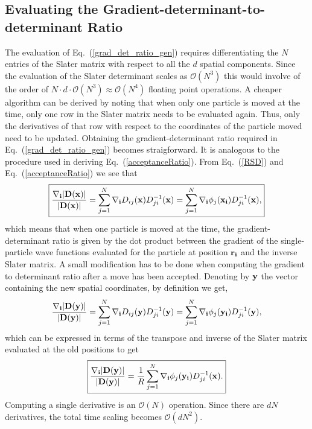 \subsection{Evaluating the Gradient-determinant-to-determinant Ratio}
The evaluation of Eq.~(\ref{grad_det_ratio_gen}) requires differentiating the $N$ entries of the Slater matrix with respect to all the $d$ spatial components. Since the evaluation of the Slater determinant scales as $\mathcal{O}(N^3)$ this would involve of the order of $N \cdot d \cdot \mathcal{O}(N^3) \approx \mathcal{O}(N^4)$ floating point operations. A cheaper algorithm can be derived by noting that when only one particle is moved at the time, 
only one row in the Slater matrix needs to be evaluated again. Thus, only the derivatives of that row with respect to the coordinates of the particle moved need to be updated. Obtaining the gradient-determinant ratio required in Eq.~(\ref{grad_det_ratio_gen}) becomes straigforward. It is analogous to the procedure used in deriving Eq.~(\ref{acceptanceRatio}). From Eq.~(\ref{RSD}) and Eq.~(\ref{acceptanceRatio}) we see that
\begin{equation}\label{gradDetRatioO}
\boxed{\frac{{\bf \nabla_i}|{\bf D}({\bf x})|}{|{\bf D}({\bf x})|} = \sum_{j=1}^{N} {\bf \nabla_i} D_{ij}({\bf x}) D_{ji}^{-1}({\bf x}) = \sum_{j=1}^{N} {\bf \nabla_i}\phi_j({\bf x_i}) D_{ji}^{-1}({\bf x}),}
\end{equation}
which means that when one particle is moved at the time, the gradient-determinant ratio is given by the dot product between the gradient of the single-particle wave functions evaluated for the particle at position ${\bf r_i}$ and the inverse Slater matrix.
A small modification has to be done when computing the gradient to determinant ratio after a move has been accepted. Denoting by ${\bf y}$ the vector containing the new spatial coordinates, by definition we get,
$$
\frac{{\bf \nabla_i}|{\bf D}({\bf y})|}{|{\bf D}({\bf y})|} = \sum_{j=1}^{N} {\bf \nabla_i} D_{ij}({\bf y}) D_{ji}^{-1}({\bf y}) = \sum_{j=1}^{N} {\bf \nabla_i}\phi_j({\bf y_i}) D_{ji}^{-1}({\bf y}),
$$
which can be expressed in terms of the transpose and inverse of the Slater matrix evaluated at the old positions\cite{abinitio} to get
\begin{equation}\label{gradDetRatioN}
\boxed{\frac{{\bf \nabla_i}|{\bf D}({\bf y})|}{|{\bf D}({\bf y})|} = \frac{1}{R} \sum_{j=1}^{N} {\bf \nabla_i}\phi_j({\bf y_i}) D_{ji}^{-1}({\bf x}).}
\end{equation}
Computing a single derivative is an $\mathcal{O}(N)$ operation. Since there are $dN$ derivatives, the total time scaling becomes $\mathcal{O}(dN^2)$.


